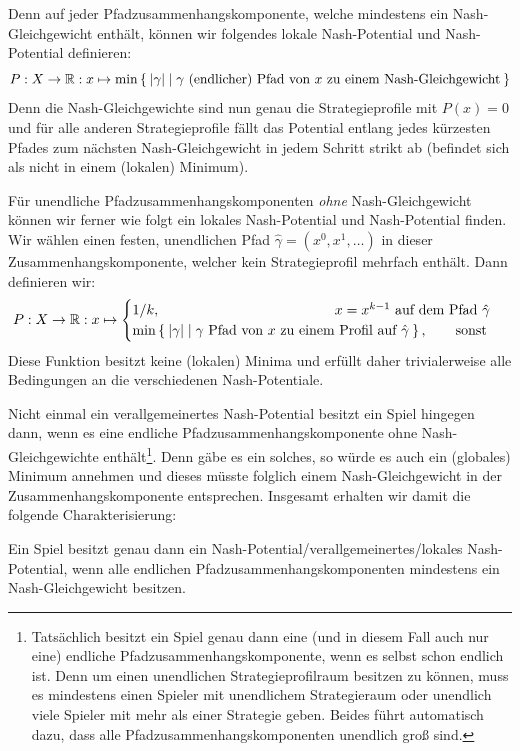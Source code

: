 Denn auf jeder Pfadzusammenhangskomponente, welche mindestens ein Nash-Gleichgewicht enthält, können wir folgendes lokale Nash-Potential und Nash-Potential definieren:
	\[P: X \to \mathbb{R}: x \mapsto \min\Set{\left|\gamma\right| | \gamma \text{ (endlicher) Pfad von } x \text{ zu einem Nash-Gleichgewicht}} \]
Denn die Nash-Gleichgewichte sind nun genau die Strategieprofile mit $P(x) = 0$ und für alle anderen Strategieprofile fällt das Potential entlang jedes kürzesten Pfades zum nächsten Nash-Gleichgewicht in jedem Schritt strikt ab (befindet sich als nicht in einem (lokalen) Minimum).

Für unendliche Pfadzusammenhangskomponenten \emph{ohne} Nash-Gleichgewicht können wir ferner wie folgt ein lokales Nash-Potential und Nash-Potential finden. Wir wählen einen festen, unendlichen Pfad $\hat{\gamma} = (x^0, x^1, \dots)$ in dieser Zusammenhangskomponente, welcher kein Strategieprofil mehrfach enthält. Dann definieren wir:
	\[P: X \to \IR: x \mapsto \begin{cases}
		1/k, \hspace{12.5em} x = x^{k-1} \text{ auf dem Pfad } \hat{\gamma} \\
		\min\Set{\abs{\gamma} | \gamma \text{ Pfad von $x$ zu einem Profil auf $\hat{\gamma}$}}, \qquad\text{sonst}
	\end{cases}\]
Diese Funktion besitzt keine (lokalen) Minima und erfüllt daher trivialerweise alle Bedingungen an die verschiedenen Nash-Potentiale.

Nicht einmal ein verallgemeinertes Nash-Potential besitzt ein Spiel hingegen dann, wenn es eine endliche Pfadzusammenhangskomponente ohne Nash-Gleichgewichte enthält\footnote{Tatsächlich besitzt ein Spiel genau dann eine (und in diesem Fall auch nur eine) endliche Pfadzusammenhangskomponente, wenn es selbst schon endlich ist. Denn um einen unendlichen Strategieprofilraum besitzen zu können, muss es mindestens einen Spieler mit unendlichem Strategieraum oder unendlich viele Spieler mit mehr als einer Strategie geben. Beides führt automatisch dazu, dass alle Pfadzusammenhangskomponenten unendlich groß sind.}. Denn gäbe es ein solches, so würde es auch ein (globales) Minimum annehmen und dieses müsste folglich einem Nash-Gleichgewicht in der Zusammenhangskomponente entsprechen. Insgesamt erhalten wir damit die folgende Charakterisierung:

\begin{satz}\label{satz:CharExNashPot}
	Ein Spiel besitzt genau dann ein Nash-Potential/verallgemeinertes/lokales Nash-Potential, wenn alle endlichen Pfadzusammenhangskomponenten mindestens ein Nash-Gleichgewicht besitzen.
\end{satz}



